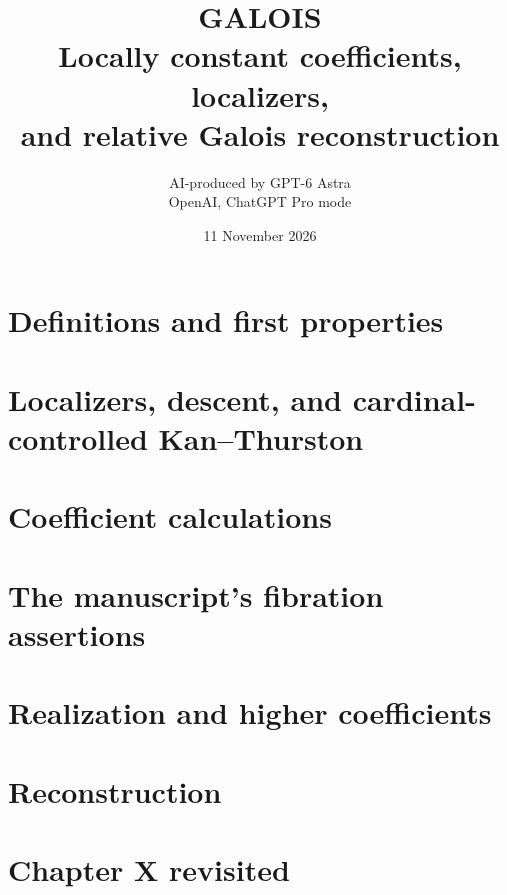 \documentclass[11pt,a4paper]{article}
\title{GALOIS\\Locally constant coefficients, localizers,\\and relative Galois reconstruction}
\author{AI-produced by GPT-6 Astra\\OpenAI, ChatGPT Pro mode}
\date{11 November 2026}
\begin{document}
\maketitle

\newpage\tableofcontents\newpage
\section{Definitions and first properties}
\section{Localizers, descent, and cardinal-controlled Kan--Thurston}
\section{Coefficient calculations}
\section{The manuscript's fibration assertions}
\section{Realization and higher coefficients}
\section{Reconstruction}
\section{Chapter X revisited}
\clearpage
\nocite{GrothendieckDerivateurs,CATHOT2026,TOTASPH2026,Maunder1981}

\begingroup\raggedright

\endgroup
\end{document}
